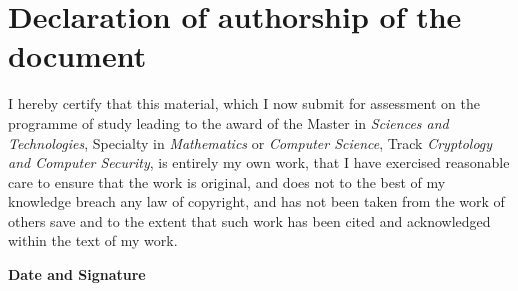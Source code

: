 \cleardoublepage
\par\vspace*{\fill}
\section*{Declaration of authorship of the document}

I hereby certify that this material, which I now submit for
  assessment on the programme of study leading to the award of the
  Master in \emph{Sciences and Technologies}, Specialty in
  \emph{Mathematics} or \emph{Computer Science}, Track
  \emph{Cryptology and Computer Security}, is entirely my own work,
  that I have exercised reasonable care to ensure that the work is
  original, and does not to the best of my knowledge breach any law of
  copyright, and has not been taken from the work of others save and
  to the extent that such work has been cited and acknowledged within
  the text of my work.
  \bigskip

  \hfill\textbf{Date and Signature}
  \newpage